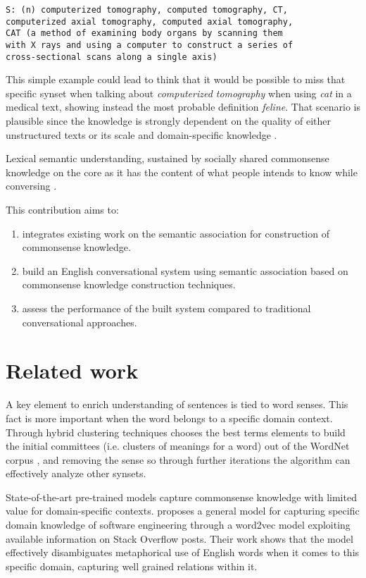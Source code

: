 \documentclass[runningheads]{llncs}
\begin{document}
\begin{Verbatim}
S: (n) computerized tomography, computed tomography, CT,
computerized axial tomography, computed axial tomography, 
CAT (a method of examining body organs by scanning them 
with X rays and using a computer to construct a series of
cross-sectional scans along a single axis) 
\end{Verbatim}

This simple example could lead to think that it would be possible to miss that specific synset when talking about \emph{computerized tomography} when using \emph{cat} in a medical text, showing instead the most probable definition \emph{feline}. That scenario is plausible since the knowledge is strongly dependent on the quality of either unstructured texts or its scale and domain-specific knowledge \cite{Ghazvininejad2017}.

Lexical semantic understanding, sustained by socially shared commonsense knowledge on the core as it has the content of what people intends to know while conversing \cite{Zhou2018}.

This contribution aims to:

\begin{enumerate}
	\item integrates existing work on the semantic association for construction of commonsense knowledge.
	\item build an English conversational system using semantic association based on commonsense knowledge construction techniques.
	\item assess the performance of the built system compared to traditional conversational approaches.
\end{enumerate}

\section{Related work}
A key element to enrich understanding of sentences is tied to word senses. This fact is more important when the word belongs to a specific domain context. Through hybrid clustering techniques \cite{Pantel2004} chooses the best terms elements to build the initial committees (i.e. clusters of meanings for a word) out of the WordNet corpus \cite{Miller1990}, and removing the sense so through further iterations the algorithm can effectively analyze other synsets.

State-of-the-art pre-trained models capture commonsense knowledge with limited value for domain-specific contexts. \cite{Efstathiou2018} proposes a general model for capturing specific domain knowledge of software engineering through a word2vec model exploiting available information on Stack Overflow posts. Their work shows that the model effectively disambiguates metaphorical use of English words when it comes to this specific domain, capturing well grained relations within it.
\end{document}
